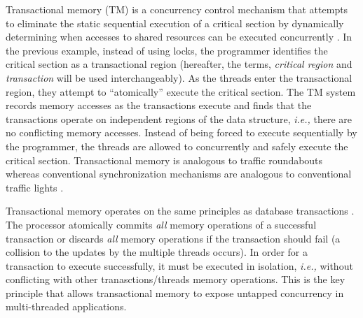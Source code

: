 \documentclass[11pt]{book}
\begin{document}
Transactional memory (TM) is a concurrency control mechanism that attempts to eliminate
the static sequential execution of a critical section by dynamically determining when
accesses to shared resources can be executed concurrently \cite{sle_rajwar}.  In the
previous example, instead of using locks, the programmer identifies the critical section
as a transactional region (hereafter, the terms, \emph{critical region} and
\emph{transaction} will be used interchangeably).  As the threads enter the transactional
region, they attempt to ``atomically'' execute the critical section.  The TM system
records memory accesses as the transactions execute and finds that the transactions
operate on independent regions of the data structure, \emph{i.e.,} there are no
conflicting memory accesses.  Instead of being forced to execute sequentially by the
programmer, the threads are allowed to concurrently and safely execute the critical
section.  Transactional memory is analogous to traffic roundabouts whereas conventional
synchronization mechanisms are analogous to conventional traffic lights
\cite{neuling_vid}.

Transactional memory operates on the same principles as database transactions
\cite{tm_2nd}.  The processor atomically commits \emph{all} memory operations of a
successful transaction or discards \emph{all} memory operations if the transaction should
fail (a collision to the updates by the multiple threads occurs).  In order for a
transaction to execute successfully, it must be executed in isolation, \emph{i.e.,}
without conflicting with other tranasctions/threads memory operations.  This is the key
principle that allows transactional memory to expose untapped concurrency in
multi-threaded applications.
\end{document}
